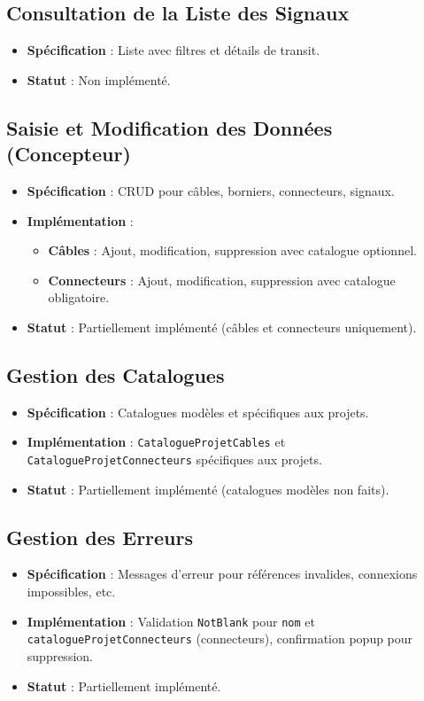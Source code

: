 \documentclass[a4paper,12pt]{article}
\begin{document}
\subsection{Consultation de la Liste des Signaux}
\begin{itemize}
    \item \textbf{Spécification} : Liste avec filtres et détails de transit.
    \item \textbf{Statut} : Non implémenté.
\end{itemize}

\subsection{Saisie et Modification des Données (Concepteur)}
\begin{itemize}
    \item \textbf{Spécification} : CRUD pour câbles, borniers, connecteurs, signaux.
    \item \textbf{Implémentation} :
    \begin{itemize}
        \item \textbf{Câbles} : Ajout, modification, suppression avec catalogue optionnel.
        \item \textbf{Connecteurs} : Ajout, modification, suppression avec catalogue obligatoire.
    \end{itemize}
    \item \textbf{Statut} : Partiellement implémenté (câbles et connecteurs uniquement).
\end{itemize}

\subsection{Gestion des Catalogues}
\begin{itemize}
    \item \textbf{Spécification} : Catalogues modèles et spécifiques aux projets.
    \item \textbf{Implémentation} : \texttt{CatalogueProjetCables} et \texttt{CatalogueProjetConnecteurs} spécifiques aux projets.
    \item \textbf{Statut} : Partiellement implémenté (catalogues modèles non faits).
\end{itemize}

\subsection{Gestion des Erreurs}
\begin{itemize}
    \item \textbf{Spécification} : Messages d’erreur pour références invalides, connexions impossibles, etc.
    \item \textbf{Implémentation} : Validation \texttt{NotBlank} pour \texttt{nom} et \texttt{catalogueProjetConnecteurs} (connecteurs), confirmation popup pour suppression.
    \item \textbf{Statut} : Partiellement implémenté.
\end{itemize}
\end{document}

